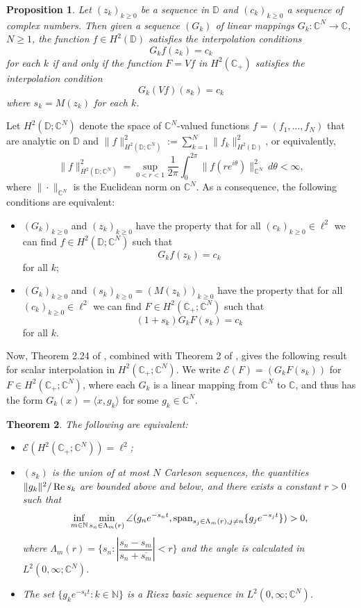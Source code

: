 \documentclass[11pt]{amsart}
\newtheorem{thm}{Theorem}[section]
\newtheorem{prop}[thm]{Proposition}
\theoremstyle{definition}
\theoremstyle{remark}
\numberwithin{equation}{section}
\newcommand{\re}{\mathop{\rm Re}\nolimits}
\def\CC{{\mathbb C}}
\def\DD{{\mathbb D}}
\def\EE{\mathcal E}
\def\NN{\mathbb N}
\def\spam{\mathop{\rm span}\nolimits}
\begin{document}
{\begin{prop}
Let $(z_k)_{k\geq 0}$ be a sequence in $\DD$ and $(c_k)_{k\geq 0}$ a sequence of complex numbers. Then given a sequence $(G_k)$ of linear mappings $G_k: \CC^N \to \CC$, $N\geq 1$, the function $f \in H^2(\DD)$ satisfies the interpolation conditions
$$G_k f(z_k)=c_k$$
for each $k$ if and only if the function $F=Vf$ in $H^2(\CC_+)$ satisfies the interpolation condition
$$G_k (Vf)(s_k)=c_k$$
where $s_k=M(z_k)$ for each $k$.
\end{prop}

Let $H^2(\mathbb{D}; \mathbb{C}^N)$ denote the space of $\mathbb{C}^N$-valued functions $f = (f_1,\ldots,f_N)$ that are analytic on $\mathbb{D}$
and $\|f\|_{H^2(\mathbb{D}; \mathbb{C}^N)}^2:= \sum_{k=1}^N \|f_k\|_{H^2(\mathbb{D})}^2$, or equivalently,
\[
\|f\|_{H^2(\mathbb{D}; \mathbb{C}^N)}^2= \sup_{0<r<1} \frac{1}{2\pi}
\int_{0}^{2\pi} \|f(re^{i\theta})\|_{\mathbb{C}^N}^2 \, d\theta
< \infty,
\]
where $\|\cdot\|_{\mathbb{C}^N}$ is the Euclidean norm on $\mathbb{C}^N$. As a consequence, the following conditions are equivalent:


\begin{itemize}
  \item $(G_k)_{k\geq 0}$ and $(z_k)_{k\geq 0}$ have the property that for all $(c_k)_{k\geq 0} \in \ell^2$
  we can find $f \in H^2(\DD; \CC^N)$ such that $$G_k f(z_k)=c_k$$ for all $k$;
  \item $(G_k)_{k\geq 0}$ and $(s_k)_{k\geq 0}=(M(z_k))_{k\geq 0}$ have the property that for all $(c_k)_{k\geq 0} \in \ell^2$
  we can find $F \in H^2(\CC_+; \CC^N)$ such that $$(1+s_k)G_k F(s_k)=c_k$$ for all $k$.
  \end{itemize}


Now, Theorem 2.24 of \cite{JPP07}, combined with Theorem 2 of \cite{JZ01}, gives the following result for scalar interpolation in $H^2(\CC_+;\CC^N)$.
We write $\EE(F)=(G_k F(s_k))$ for $F \in H^2(\CC_+;\CC^N)$, where each $G_k$
is a linear mapping from $\CC^N$ to $\CC$, and thus has the form $G_k(x)=\langle x, g_k \rangle$ for some $g_k \in \CC^N$.


\begin{thm}
 The following are equivalent:
 \begin{itemize}
 \item $\EE(H^2(\CC_+;\CC^N))= \ell^2$;
 \item $(s_k)$ is the union of at most $N$ Carleson sequences, the
 quantities\\ $\|g_k\|^2/\re s_k$ are bounded above and below, and there exists a constant
 $r>0$ such that
 \[
 \inf_{m \in \NN} \min_{s_n \in \Lambda_m(r)} \angle (g_n e^{-s_n t}, \spam_{s_j\in\Lambda_m(r), j \ne n}
 \{ g_j e^{-s_j t}\} ) > 0,
 \]
 where $\Lambda_m(r) = \{ s_n : \left| \dfrac{s_n-s_m}{s_n+\overline{s_m}} \right| < r \}$
 and the angle is calculated in $L^2(0,\infty; \CC^N)$.
 \item The set $\{ g_k e^{-s_k t}: k \in \NN\}$ is a Riesz basic sequence
 in $L^2(0,\infty; \CC^N)$.
 \end{itemize}
 \end{thm}

}
\end{document}
